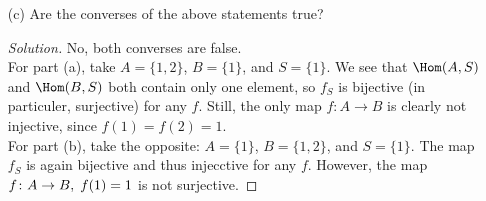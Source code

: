 \begin{problem}
\begin{enumerate}
        \item[(c)]
            Are the converses of the above statements true?
            \begin{proof}[Solution]
                No, both converses are false.\\
                For part (a), take $A = \{1,2\}$, $B = \{1\}$, and $S = \{1\}$. We see that $\Hom(A,S)$ and $\Hom(B,S)$ both contain only one element, so $f_S$ is bijective (in particuler, surjective) for any $f$. Still, the only map $f \colon A \to B$ is clearly not injective, since $f(1) = f(2) = 1$.\\
                For part (b), take the opposite: $A = \{1\}$, $B = \{1,2\}$, and $S = \{1\}$. The map $f_S$ is again bijective and thus injecctive for any $f$. However, the map $f \colon A \to B, \hspace{1mm} f(1) = 1$ is not surjective.
            \end{proof}
    \end{enumerate}
\end{problem}

